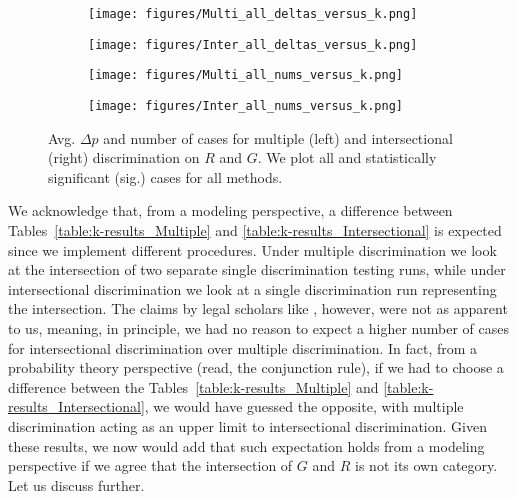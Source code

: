 %
\begin{figure}[t]
    \begin{subfigure}{.45\linewidth}
    \texttt{[image: figures/Multi\_all\_deltas\_versus\_k.png]}
    \caption{}
    \end{subfigure}
\hfill
    \begin{subfigure}{.45\linewidth}
    \texttt{[image: figures/Inter\_all\_deltas\_versus\_k.png]}
    \caption{}
    \end{subfigure}
    \medskip
    \begin{subfigure}{.45\linewidth}
    \texttt{[image: figures/Multi\_all\_nums\_versus\_k.png]}
    \caption{}
    \end{subfigure}
\hfill
    \begin{subfigure}{.45\linewidth}
    \texttt{[image: figures/Inter\_all\_nums\_versus\_k.png]}
    \caption{}
    \end{subfigure}
\caption{Avg. $\Delta p$ and number of cases for multiple (left) and intersectional (right) discrimination on $R$ and $G$. We plot all and statistically significant (sig.) cases for all methods.}
\label{fig:LawSchoolMultiDiscrimination_allmethods_k_param}
\end{figure}
%

We acknowledge that, from a modeling perspective, a difference between Tables~\ref{table:k-results_Multiple} and \ref{table:k-results_Intersectional} is expected since we implement different procedures.
Under multiple discrimination we look at the intersection of two separate single discrimination testing runs, while under intersectional discrimination we look at a single discrimination run representing the intersection. 
%
The claims by legal scholars like \textcite{Crenshaw1989_DemarginalizingTheIntersection, Xenidis2020_TunningEULaw}, however, were not as apparent to us, meaning, in principle, we had no reason to expect a higher number of cases for intersectional discrimination over multiple discrimination.
%
In fact, from a probability theory perspective (read, the conjunction rule), if we had to choose a difference between the Tables~\ref{table:k-results_Multiple} and \ref{table:k-results_Intersectional}, we would have guessed the opposite, with multiple discrimination acting as an upper limit to intersectional discrimination.
Given these results, we now would add that such expectation holds from a modeling perspective if we agree that the intersection of $G$ and $R$ is not its own category. Let us discuss further.

